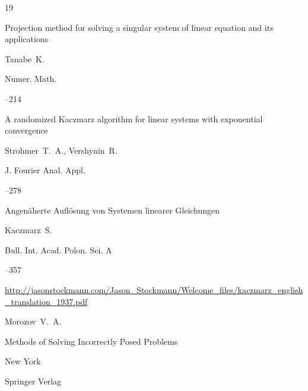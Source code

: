\begin{thebibliography}{19}







\paper Projection method for solving a singular system of linear equation and its applications

\by Tanabe~K.

\jour Numer. Math.




--214






\paper A randomized Kaczmarz algorithm for linear systems with exponential convergence

\by Strohmer~T.~A., Vershynin~R.

\jour  J. Fourier Anal. Appl.



--278




\paper Angen\"aherte Aufl\"osung von Systemen linearer Gleichungen

\by Kaczmarz~S.

\jour Bull. Int. Acad. Polon. Sci. A 



--357


\elink \url{http://jasonstockmann.com/Jason_Stockmann/Welcome_files/kaczmarz_english_translation_1937.pdf}






\by Morozov~V.~A.

\book Methods of Solving Incorrectly Posed Problems

\publaddr New York

\publ Springer Verlag


\end{thebibliography}
